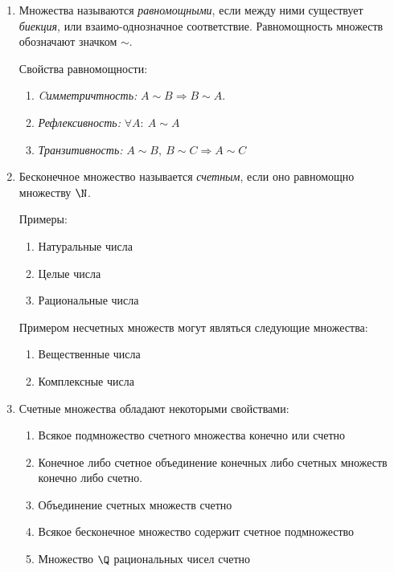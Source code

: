 \documentclass[a4paper,12pt]{article}
\begin{document}
\begin{enumerate}
		\item 
		Множества называются \textit{равномощными}, если между ними существует \textit{биекция}, или взаимо-однозначное 	соответствие. Равномощность множеств обозначают значком $\sim$.
		
		Свойства равномощности:
		\begin{enumerate}
			\item \textit{Cимметричтность:} $A \sim B \Rightarrow B \sim A$.
			\item \textit{Рефлексивность:} $\forall A: \ A \sim A$
			\item \textit{Транзитивность:} $A \sim B, \ B \sim C  \Rightarrow A \sim C$
		\end{enumerate}
	\item 
    Бесконечное множество называется \textit{счетным}, если оно равномощно множеству $\N$.

    Примеры: 
    
    \begin{enumerate}
        \item Натуральные числа
        \item Целые числа
        \item Рациональные числа
    \end{enumerate}

    Примером несчетных множеств могут являться следующие множества:
    \begin{enumerate}
        \item Вещественные числа
        \item Комплексные числа
    \end{enumerate}

	\item 
	Счетные множества обладают некоторыми свойствами:
	\begin{enumerate}
        \item Всякое подмножество счетного множества конечно или счетно
        \item Конечное либо счетное объединение конечных либо счетных множеств конечно либо счетно.
		\item Объединение счетных множеств счетно
		\item Всякое бесконечное множество содержит счетное подмножество
		\item Множество $\Q$ рациональных чисел счетно
		

\end{enumerate}
\end{enumerate}
\end{document}
